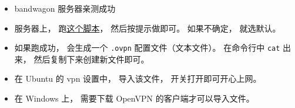 
\begin{issues}
\issueDraft
\end{issues}

\begin{itemize}
\item bandwagon 服务器亲测成功
\item 服务器上， 跑\href{https://github.com/MacroUniverse/openvpn-install/blob/master/openvpn-install.sh}{这个脚本}， 然后按提示做即可。 如果不确定， 就选默认。
\item 如果跑成功， 会生成一个 \verb|.ovpn| 配置文件（文本文件）。 在命令行中 \verb|cat| 出来， 然后复制下来创建新文件即可。
\item 在 Ubuntu 的 vpn 设置中， 导入该文件， 开关打开即可开心上网。
\item 在 Windows 上， 需要下载 OpenVPN 的客户端才可以导入文件。
\end{itemize}
